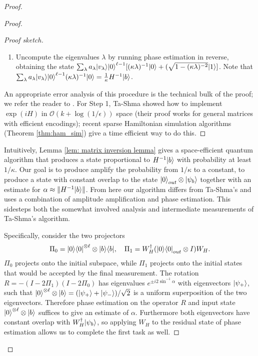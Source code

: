 \documentclass[11pt]{article}
\theoremstyle{definition}
\theoremstyle{remark}
\newcommand\bigoh{\mathcal{O}}
\begin{document}
\begin{proof}
\begin{proof}
\begin{proof}[Proof sketch]
\begin{enumerate}
\item Uncompute the eigenvalues $\lambda$ by running phase estimation in reverse, obtaining the state
$\sum_{\lambda} a_\lambda {\left\vert{v_\lambda}\right\rangle}{\left\vert{0}\right\rangle}^{\ell-1}[(\kappa\lambda)^{-1}{\left\vert{0}\right\rangle}+(\sqrt{1-(\kappa\lambda)^{-2}}{\left\vert{1}\right\rangle}]$. Note that $\sum_{\lambda} a_\lambda {\left\vert{v_\lambda}\right\rangle}{\left\vert{0}\right\rangle}^{\ell-1}(\kappa\lambda)^{-1}{\left\vert{0}\right\rangle} = \frac{1}{\kappa} H^{-1}{\left\vert{b}\right\rangle}$.
\end{enumerate}
An appropriate error analysis of this procedure is the technical bulk of the proof; we refer the reader to \cite{HHL}. For Step 1, Ta-Shma showed how to implement $\exp(iH)$ in $\bigoh (k+\log(1/\epsilon))$ space \cite[Theorem~4.1]{tashma} (their proof works for general matrices with efficient encodings); recent sparse Hamiltonian simulation algorithms (Theorem \ref{thm:ham_sim}) give a time efficient way to do this.
\end{proof}
Intuitively, Lemma \ref{lem: matrix inversion lemma} gives a space-efficient quantum algorithm that produces a state proportional to $H^{-1}{\left\vert{b}\right\rangle}$ with probability at least $1/\kappa$.  Our goal is to produce amplify the probability from $1/\kappa$ to a constant, to produce a state with constant overlap to the state ${\left\vert{0}\right\rangle}_{out} \otimes {\left\vert{\psi_b}\right\rangle}$ together with an estimate for $\alpha \approx \|H^{-1}{\left\vert{b}\right\rangle}\|$.  From here our algorithm differs from Ta-Shma's and uses a combination of amplitude amplification and phase estimation.  This sidesteps both the somewhat involved analysis and intermediate measurements of Ta-Shma's algorithm. 


Specifically, consider the two projectors
\begin{equation}
\Pi_0 = {\left\vert{0}\right\rangle}{\left\langle{0}\right\vert}^{\otimes \ell} \otimes {\left\vert{b}\right\rangle}{\left\langle{b}\right\vert}, \quad \Pi_1 = W_H^\dagger ({\left\vert{0}\right\rangle}{\left\langle{0}\right\vert}_{out} \otimes I) W_H.
\end{equation}
$\Pi_0$ projects onto the initial subspace, while $\Pi_1$ projects onto the initial states that would be accepted by the final measurement. The rotation $R=-(I-2\Pi_1)(I-2\Pi_0)$ has eigenvalues $e^{\pm i2\sin^{-1}\alpha}$ with eigenvectors ${\left\vert{\psi_+}\right\rangle}$, such that ${\left\vert{0}\right\rangle}^{\otimes \ell} \otimes {\left\vert{b}\right\rangle} = ({\left\vert{\psi_+}\right\rangle}+{\left\vert{\psi_-}\right\rangle})/\sqrt{2}$ is a uniform superposition of the two eigenvectors. Therefore phase estimation on the operator $R$ and input state ${\left\vert{0}\right\rangle}^{\otimes \ell} \otimes {\left\vert{b}\right\rangle}$ suffices to give an estimate of $\alpha$. Furthermore both eigenvectors have constant overlap with $W_H^{\dagger}{\left\vert{\psi_b}\right\rangle}$, so applying $W_H$ to the residual state of phase estimation allows us to complete the first task as well.


\end{proof}
\end{proof}
\end{document}
